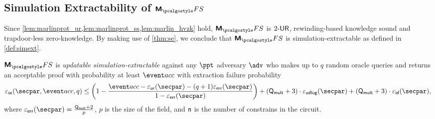 \subsection{Simulation Extractability of $\marlinprotfs$}
Since \cref{lem:marlinprot_ur,lem:marlinprot_ss,lem:marlin_hvzk} hold, $\marlinprotfs$ is ${2\text{-}\mathsf{UR}}$, rewinding-based knowledge sound and trapdoor-less zero-knowledge. By making use
of \cref{thm:se}, we conclude that $\marlinprotfs$ is simulation-extractable as defined in \cref{def:simext}.

\begin{corollary}
	\label{thm:marlinprotfs_se}
	$\marlinprotfs$ is \emph{updatable simulation-extractable} against any $\ppt$ adversary $\advse$ who makes up to $q$ random oracle queries and returns an acceptable proof with probability at least $\accProb$ with extraction failure probability 
	\[
	\epsse(\secpar, \accProb, q) \leq \left(1 - \frac{\accProb - \epsur (\secpar) - (q + 1) \epserr (\secpar)} {1 - \epserr (\secpar)}\right) + (\multconstr  + 3) \cdot \epsudlog (\secpar) + (\multconstr + 3) \cdot \epsid (\secpar),
	\]
	where $\epserr (\secpar) = \frac{\multconstr + 2}{p}$, $p$ is the size of the field, and $\mathsf{n}$ is the number of constrains in the circuit. 
\end{corollary}


%
%
%
%

